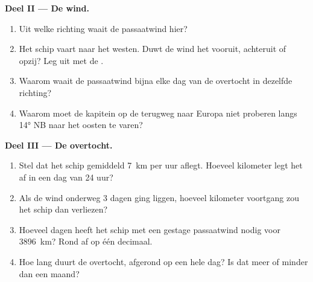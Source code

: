 \begin{problem}
\noindent\textbf{Deel II --- De wind.}\par\nopagebreak
\begin{enumerate}[resume, beginpenalty=10000]
  \item Uit welke richting waait de passaatwind hier?
  \item Het schip vaart naar het westen. Duwt de wind het vooruit,
        achteruit of opzij? Leg uit met de .
  \item Waarom waait de passaatwind bijna elke dag van de overtocht in
        dezelfde richting?
  \item Waarom moet de kapitein op de terugweg naar Europa niet proberen
        langs \ang{14} NB naar het oosten te varen?
\end{enumerate}

\noindent\textbf{Deel III --- De overtocht.}\par\nopagebreak
\begin{enumerate}[resume, beginpenalty=10000]
  \item Stel dat het schip gemiddeld \qty{7}{km} per uur aflegt. Hoeveel
        kilometer legt het af in een dag van 24 uur?
  \item Als de wind onderweg 3 dagen ging liggen, hoeveel kilometer
        voortgang zou het schip dan verliezen?
  \item Hoeveel dagen heeft het schip met een gestage passaatwind nodig voor
        \qty{3896}{km}? Rond af op één decimaal.
  \item Hoe lang duurt de overtocht, afgerond op een hele dag? Is dat meer
        of minder dan een maand?
\end{enumerate}
\end{problem}

